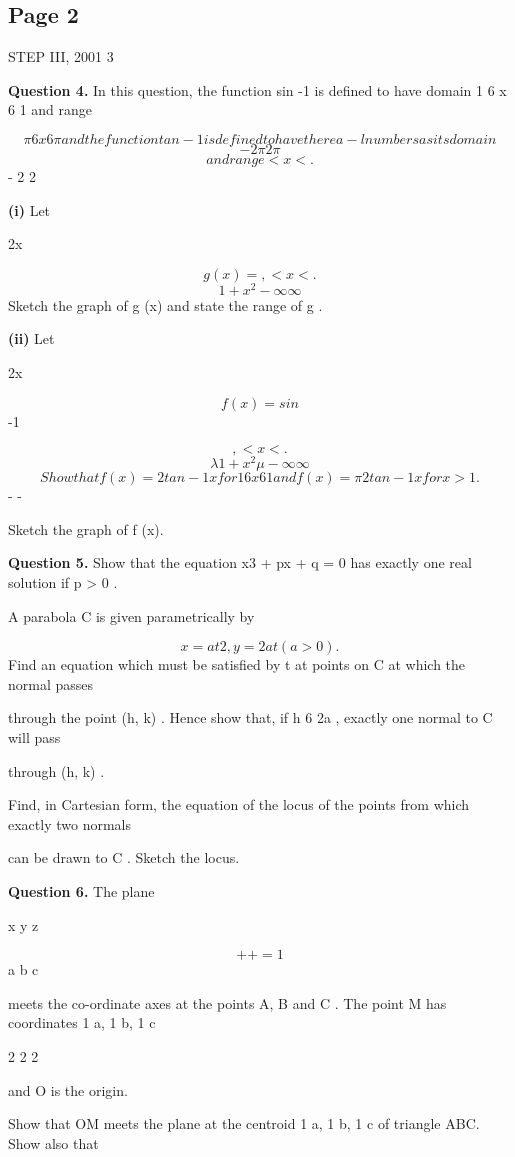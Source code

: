 \documentclass[12pt]{article}
\begin{document}
\subsection*{Page 2}
\begin{flushleft}
STEP III, 2001 3\par
\bigskip\textbf{Question 4.} In this question, the function sin -1 is defined to have domain 1 6 x 6 1 and range\par
\[\pi 6 x 6 \pi and the function tan -1 is defined to have the rea - l numbers as its domain\]
\[- 2 \pi 2 \pi\]
\[and range < x < .\]
- 2 2\par
\textbf{(i)} Let\par
2x\par
\[g (x) = , < x < .\]
\[1 + x^2 -\infty \infty\]
Sketch the graph of g (x) and state the range of g .\par
\textbf{(ii)} Let\par
2x\par
\[f (x) = sin\]
-1\par
\[, < x < .\]
\[\lambda 1 + x^2 \mu -\infty \infty\]
\[Show that f (x) = 2 tan -1 x for 1 6 x 6 1 and f (x) = \pi 2 tan -1 x for x > 1 .\]
- -\par
Sketch the graph of f (x).\par
\bigskip\textbf{Question 5.} Show that the equation x3 + px + q = 0 has exactly one real solution if p > 0 .\par
A parabola C is given parametrically by\par
\[x = at2, y = 2at (a > 0) .\]
Find an equation which must be satisfied by t at points on C at which the normal passes\par
through the point (h, k) . Hence show that, if h 6 2a , exactly one normal to C will pass\par
through (h, k) .\par
Find, in Cartesian form, the equation of the locus of the points from which exactly two normals\par
can be drawn to C . Sketch the locus.\par
\bigskip\textbf{Question 6.} The plane\par
x y z\par
\[+ + = 1\]
a b c\par
meets the co-ordinate axes at the points A, B and C . The point M has coordinates 1 a, 1 b, 1 c\par
2 2 2\par
and O is the origin.\par
Show that OM meets the plane at the centroid 1 a, 1 b, 1 c of triangle ABC. Show also that\par

\end{flushleft}
\end{document}
